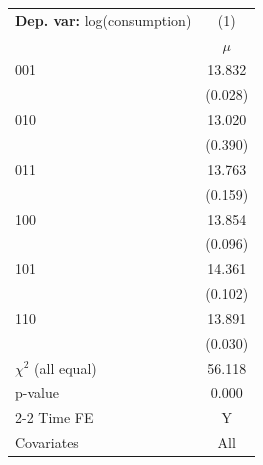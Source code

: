 \begin{tabular}{l c} \toprule  \textbf{Dep. var:}  log(consumption) 
                    &\multicolumn{1}{c}{(1)}         \\
                    &       $\mu$         \\
001                 &      13.832\sym{***}\\
                    &     (0.028)         \\
010                 &      13.020\sym{***}\\
                    &     (0.390)         \\
011                 &      13.763\sym{***}\\
                    &     (0.159)         \\
100                 &      13.854\sym{***}\\
                    &     (0.096)         \\
101                 &      14.361\sym{***}\\
                    &     (0.102)         \\
110                 &      13.891\sym{***}\\
                    &     (0.030)         \\
\addlinespace
$\chi^2$ (all equal)&      56.118         \\
p-value             &       0.000         \\
\cmidrule{2-2} Time FE & Y \\ Covariates & All \\ \bottomrule \end{tabular}
